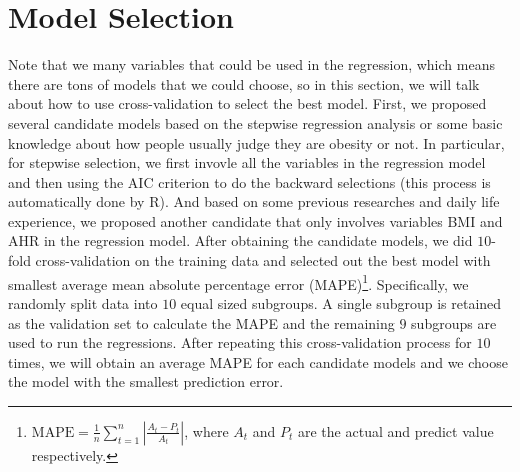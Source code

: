 \documentclass[letterpaper,10pt]{article}
\begin{document}
\section{Model Selection}
Note that we many variables that could be used in the regression, which means there are tons of models that we could choose, so in this section, we will talk about how to use cross-validation to select the best model. First, we proposed several candidate models based on the stepwise regression analysis or some basic knowledge about how people usually judge they are obesity or not. In particular, for stepwise selection, we first invovle all the variables in the regression model and then using the AIC criterion to do the backward selections (this process is automatically done by R). And based on some previous researches and daily life experience, we proposed another candidate that only involves variables BMI and AHR in the regression model. After obtaining the candidate models, we did $10$-fold cross-validation on the training data and selected out the best model with smallest average mean absolute percentage error (MAPE)\footnote{$\text{MAPE} = \frac{1}{n}\sum_{t=1}^{n}|\frac{A_t - P_t}{A_t}|$, where $A_t$ and $P_t$ are the actual and predict value respectively.}. Specifically, we randomly split data into $10$ equal sized subgroups. A single subgroup is retained as the validation set to calculate the MAPE and the remaining $9$ subgroups are used to run the regressions. After repeating this cross-validation process for $10$ times, we will obtain an average MAPE for each candidate models and we choose the model with the smallest prediction error.





















\end{document}
